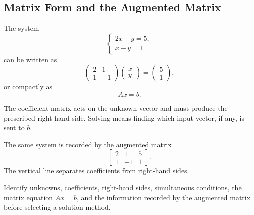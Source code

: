 \subsection{Matrix Form and the Augmented Matrix}

The system
\[
\begin{cases}
2x+y=5,\\
x-y=1
\end{cases}
\]
can be written as
\[
\begin{pmatrix}2&1\\1&-1\end{pmatrix}
\begin{pmatrix}x\\y\end{pmatrix}
=
\begin{pmatrix}5\\1\end{pmatrix},
\]
or compactly as
\[
\boxed{Ax=b}.
\]

\begin{interpretationbox}
The coefficient matrix acts on the unknown vector and must produce the prescribed right-hand side. Solving means finding which input vector, if any, is sent to $b$.
\end{interpretationbox}

The same system is recorded by the augmented matrix
\[
\left[\begin{array}{cc|c}
2&1&5\\1&-1&1
\end{array}\right].
\]
The vertical line separates coefficients from right-hand sides.

\begin{summarybox}
Identify unknowns, coefficients, right-hand sides, simultaneous conditions, the matrix equation $Ax=b$, and the information recorded by the augmented matrix before selecting a solution method.
\end{summarybox}
